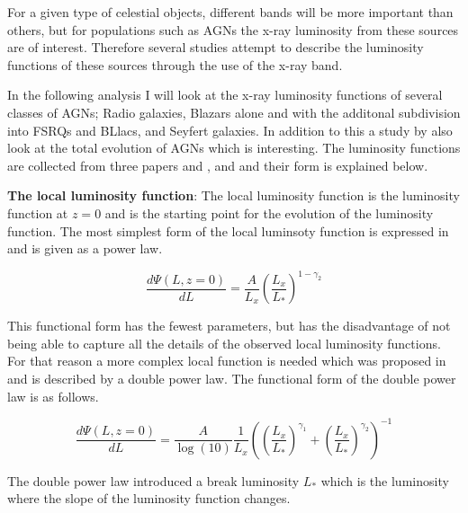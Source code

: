\documentclass{article}
\begin{document}

For a given type of celestial objects, different bands will be more important than others, but for populations such as AGNs
 the x-ray luminosity from these sources are of interest. 
Therefore several studies attempt to describe the luminosity functions of these sources through the use of the x-ray band. 

In the following analysis I will look at the x-ray luminosity functions of several classes of AGNs; Radio galaxies, Blazars alone and with the additonal subdivision into FSRQs and BLlacs, and Seyfert galaxies. In addition to this 
a study by \cite{Ueda_2014} also look at the total evolution of AGNs which is interesting. The luminosity functions are collected from three papers \cite{Ajello_2009} and \cite{Silverman_2008}, and \cite{Ueda_2014} and their form is explained below.

\textbf{The local luminosity function}:
The local luminosity function is the luminosity function at $z=0$ and is the starting point for the evolution of the luminosity function.
The most simplest form of the local luminsoty function is expressed in \cite{Ajello_2009} and is given as a power law.

\begin{equation}
    \frac{d\Psi(L,z=0)}{dL} = \frac{A}{L_x} \left( \frac{L_x}{L_*}\right)^{1-\gamma_2}
\end{equation}

This functional form has the fewest parameters, but has the disadvantage of not being able to capture all the details of the observed local luminosity functions.
For that reason a more complex local function is needed which was proposed in \cite{Ueda_2003} and is described by a double power law.
The functional form of the double power law is as follows.


   
\begin{equation}
    \frac{d\Psi(L,z=0)}{dL} =  \frac{A}{\log(10)} \frac{1}{L_x} \left( \left( \frac{L_x}{L_*} \right)^{\gamma_1} + \left( \frac{L_x}{L_*} \right)^{\gamma_2} \right)^{-1}
\end{equation}

The double power law introduced a break luminosity $L_*$ which is the luminosity where the slope of the luminosity function changes.
\end{document}
